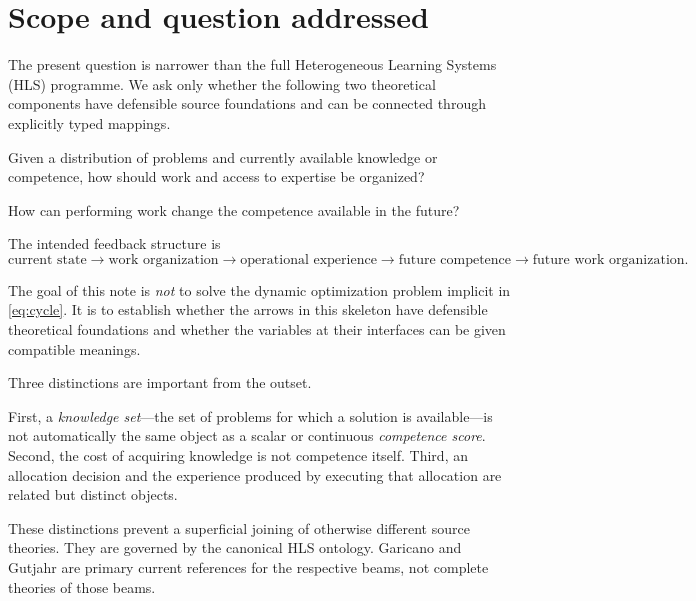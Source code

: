\section{Scope and question addressed}

The present question is narrower than the full Heterogeneous Learning Systems (HLS)
programme. We ask only whether the following two theoretical components have defensible
source foundations and can be connected through explicitly typed mappings.

\begin{description}[leftmargin=2.8cm,style=nextline]
\item[Beam 1.] Given a distribution of problems and currently available knowledge or
competence, how should work and access to expertise be organized?
\item[Beam 2.] How can performing work change the competence available in the future?
\end{description}

The intended feedback structure is
\begin{equation}
\text{current state}
\longrightarrow
\text{work organization}
\longrightarrow
\text{operational experience}
\longrightarrow
\text{future competence}
\longrightarrow
\text{future work organization}.
\label{eq:cycle}
\end{equation}

The goal of this note is \emph{not} to solve the dynamic optimization problem implicit in
\eqref{eq:cycle}. It is to establish whether the arrows in this skeleton have defensible
theoretical foundations and whether the variables at their interfaces can be given compatible
meanings.

Three distinctions are important from the outset.

First, a \emph{knowledge set}---the set of problems for which a solution is available---is
not automatically the same object as a scalar or continuous \emph{competence score}.
Second, the cost of acquiring knowledge is not competence itself. Third, an allocation
decision and the experience produced by executing that allocation are related but distinct
objects.

These distinctions prevent a superficial joining of otherwise different source theories.
They are governed by the canonical HLS ontology. Garicano and Gutjahr are primary current
references for the respective beams, not complete theories of those beams.
